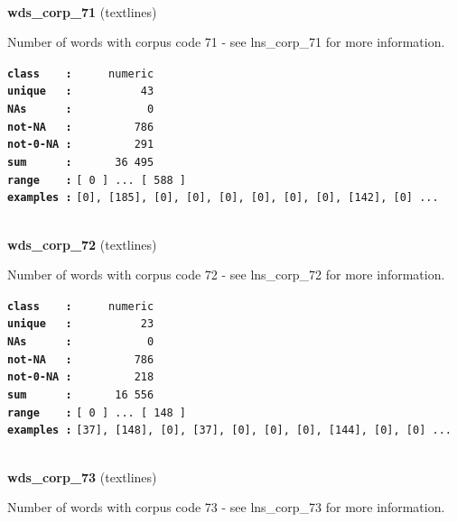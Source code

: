 \documentclass[]{article}
\begin{document}
~

\textbf{wds\_corp\_71} (textlines)

Number of words with corpus code 71 - see lns\_corp\_71 for more
information.

\textbf{\texttt{class\ \ \ \ :}} \texttt{~~~~~numeric}\\
\textbf{\texttt{unique\ \ \ :}} \texttt{~~~~~~~~~~43}\\
\textbf{\texttt{NAs\ \ \ \ \ \ :}} \texttt{~~~~~~~~~~~0}\\
\textbf{\texttt{not-NA\ \ \ :}} \texttt{~~~~~~~~~786}\\
\textbf{\texttt{not-0-NA\ :}} \texttt{~~~~~~~~~291}\\
\textbf{\texttt{sum\ \ \ \ \ \ :}} \texttt{~~~~~~36~495}\\
\textbf{\texttt{range\ \ \ \ :}}
\texttt{{[}\ 0\ {]}\ ...\ {[}\ 588\ {]}}\\
\textbf{\texttt{examples\ :}}
\texttt{{[}0{]},\ {[}185{]},\ {[}0{]},\ {[}0{]},\ {[}0{]},\ {[}0{]},\ {[}0{]},\ {[}0{]},\ {[}142{]},\ {[}0{]}\ ...}\\

~

\textbf{wds\_corp\_72} (textlines)

Number of words with corpus code 72 - see lns\_corp\_72 for more
information.

\textbf{\texttt{class\ \ \ \ :}} \texttt{~~~~~numeric}\\
\textbf{\texttt{unique\ \ \ :}} \texttt{~~~~~~~~~~23}\\
\textbf{\texttt{NAs\ \ \ \ \ \ :}} \texttt{~~~~~~~~~~~0}\\
\textbf{\texttt{not-NA\ \ \ :}} \texttt{~~~~~~~~~786}\\
\textbf{\texttt{not-0-NA\ :}} \texttt{~~~~~~~~~218}\\
\textbf{\texttt{sum\ \ \ \ \ \ :}} \texttt{~~~~~~16~556}\\
\textbf{\texttt{range\ \ \ \ :}}
\texttt{{[}\ 0\ {]}\ ...\ {[}\ 148\ {]}}\\
\textbf{\texttt{examples\ :}}
\texttt{{[}37{]},\ {[}148{]},\ {[}0{]},\ {[}37{]},\ {[}0{]},\ {[}0{]},\ {[}0{]},\ {[}144{]},\ {[}0{]},\ {[}0{]}\ ...}\\

~

\textbf{wds\_corp\_73} (textlines)

Number of words with corpus code 73 - see lns\_corp\_73 for more
information.
\end{document}
